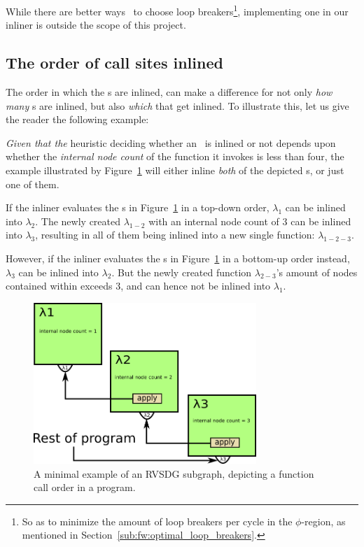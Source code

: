 While there are better ways~\cite{BasMscThesis} to choose loop
breakers\footnote{So as to minimize the amount of loop breakers per cycle in the
$\phi$-region, as mentioned in Section~\ref{sub:fw:optimal_loop_breakers}.}, implementing one in our inliner is outside the scope of this project.

\subsection{The order of call sites inlined}
\label{sub:scheme:ordering_apply_nodes}

The order in which the \applyNode s are inlined, can make a difference for not
only \textit{how many} \applyNode s are inlined, but also \textit{which} that
get inlined. To illustrate this, let us give the reader the following example:

\textit{Given that the} heuristic deciding whether an \applyNode~is inlined or
not depends upon whether the \textit{internal node count} of the function it
invokes is less than four, the example illustrated by
Figure~\ref{fig:inline_ordering_ex} will either inline \textit{both} of the
depicted \applyNode s, or just one of them.

If the inliner evaluates the \applyNode s in Figure~\ref{fig:inline_ordering_ex}
in a top-down order, $\lambda_1$ can be inlined into $\lambda_2$. The newly
created $\lambda_{1-2}$ with an internal node count of $3$ can be inlined into
$\lambda_3$, resulting in all of them being inlined into a new single function:
$\lambda_{1-2-3}$.

However, if the inliner evaluates the \applyNode s in
Figure~\ref{fig:inline_ordering_ex} in a bottom-up order instead, $\lambda_3$
can be inlined into $\lambda_2$. But the newly created function
$\lambda_{2-3}$'s amount of nodes contained within exceeds 3, and can hence not
be inlined into $\lambda_1$.

\begin{figure}[H]
	\centering
	\includegraphics[width=0.75\textwidth]{figures/inline_ordering_ex}
	\caption{A minimal example of an RVSDG subgraph, depicting a function call
order in a program.}
	\label{fig:inline_ordering_ex}
\end{figure}


